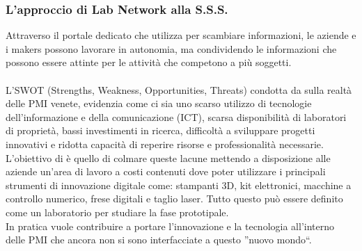 \subsubsection{L'approccio di Lab Network alla S.S.S.}
Attraverso il portale dedicato che \lab{} utilizza per scambiare informazioni, le aziende e i makers possono lavorare in autonomia, ma condividendo le informazioni che possono essere attinte per le attività che competono a più soggetti.\\
\\
L'\gls{SWOT} (Strengths, Weakness, Opportunities, Threats) condotta da \lab{} sulla realtà delle PMI venete, evidenzia come ci sia uno scarso utilizzo di tecnologie dell'informazione e della comunicazione (ICT), scarsa disponibilità di laboratori di proprietà, bassi investimenti in ricerca, difficoltà a sviluppare progetti innovativi e ridotta capacità di reperire risorse e professionalità necessarie. 
L'obiettivo di \lab{} è quello di colmare queste lacune mettendo a disposizione alle aziende un'area di lavoro a costi contenuti dove poter utilizzare i principali strumenti di innovazione digitale come: stampanti 3D, kit elettronici, macchine a controllo numerico, frese digitali e taglio laser. Tutto questo può essere definito come un laboratorio per studiare la fase prototipale.
\\
In pratica \lab{} vuole contribuire a portare l'innovazione e la tecnologia all'interno delle PMI che ancora non si sono interfacciate a questo ''nuovo mondo``.

